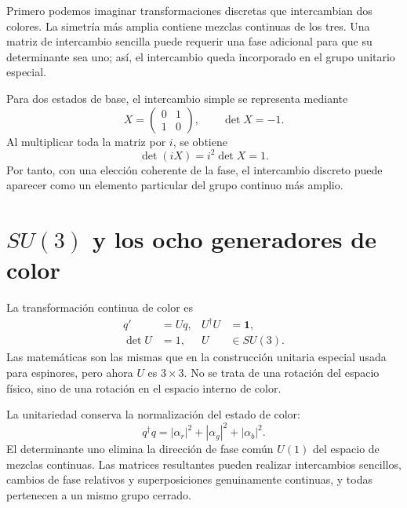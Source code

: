 Primero podemos imaginar transformaciones discretas que intercambian dos colores. La simetría más amplia contiene mezclas continuas de los tres. Una matriz de intercambio sencilla puede requerir una fase adicional para que su determinante sea uno; así, el intercambio queda incorporado en el grupo unitario especial.

Para dos estados de base, el intercambio simple se representa mediante
\begin{equation}
X=
\begin{pmatrix}0&1\\1&0\end{pmatrix},
\qquad
\det X=-1.
\end{equation}
Al multiplicar toda la matriz por \(i\), se obtiene
\begin{equation}
\det(iX)=i^2\det X=1.
\end{equation}
Por tanto, con una elección coherente de la fase, el intercambio discreto puede aparecer como un elemento particular del grupo continuo más amplio.

\begin{classroomqa}\end{classroomqa}

\section{\texorpdfstring{\(SU(3)\)}{SU(3)} y los ocho generadores de color}

La transformación continua de color es
\begin{equation}
\begin{aligned}
q'&=Uq,
&
U^\dagger U&=\boldsymbol 1,
\\
\det U&=1,
&
U&\in SU(3).
\end{aligned}
\label{eq:l3-su3-action}
\end{equation}
Las matemáticas son las mismas que en la construcción unitaria especial usada para espinores, pero ahora \(U\) es \(3\times3\). No se trata de una rotación del espacio físico, sino de una rotación en el espacio interno de color.

La unitariedad conserva la normalización del estado de color:
\begin{equation}
q^\dagger q
=|\alpha_r|^2+|\alpha_g|^2+|\alpha_b|^2.
\end{equation}
El determinante uno elimina la dirección de fase común \(U(1)\) del espacio de mezclas continuas. Las matrices resultantes pueden realizar intercambios sencillos, cambios de fase relativos y superposiciones genuinamente continuas, y todas pertenecen a un mismo grupo cerrado.

